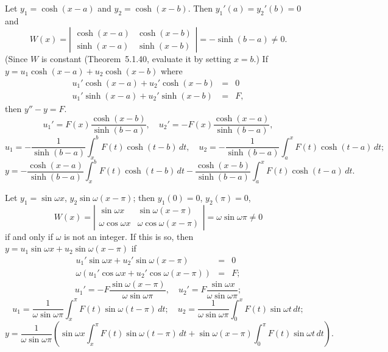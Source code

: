 \documentclass[dvips]{book}
\renewcommand{\exer}[1]{\par\medskip\;\noindent{\color{red}\bf #1.}}
\numberwithin{example}{section}
\numberwithin{equation}{section}
\numberwithin{theorem}{section}
\numberwithin{table}{section}
\numberwithin{figure}{section}
\begin{document}
\exer{13.1.14}
Let $y_{1}=\cosh(x-a)$  and $y_{2}=\cosh(x-b)$. Then
$y_{1}'(a)=y_{2}'(b)=0$  and
$$
W(x)=
\left|\begin{array}{rr}
\cosh(x-a)&\cosh(x-b)\\\sinh(x-a)&\sinh(x-b)
\end{array}\right|=-\sinh(b-a)\ne0.
$$
(Since $W$ is constant  (Theorem~5.1.40, evaluate it by
setting $x=b$.)
If \\$y=u_{1}\cosh(x-a)+u_{2}\cosh(x-b)$ where
\begin{eqnarray*}
u_{1}'\cosh(x-a)+u_{2}'\cosh(x-b)&=&0 \\
u_{1}'\sinh(x-a)+u_{2}'\sinh(x-b)&=&F,
\end{eqnarray*}
then $y''-y=F$.
$$
u_{1}'=F(x)\frac{\cosh(x-b)}{\sinh(b-a)}, \quad
u_{2}'=-F(x)\frac{\cosh(x-a)}{\sinh(b-a)},
$$
$$
u_{1}=-\frac{1}{\sinh(b-a)}\int_{x}^{b}F(t)\cosh(t-b)\,dt,\quad
u_{2}=-\frac{1}{\sinh(b-a)}\int_{a}^{x}F(t)\cosh(t-a)\,dt;
$$
$$
y=-\frac{\cosh(x-a)}{\sinh(b-a)}\int_{x}^{b}F(t)\cosh(t-b)\,dt
-\frac{\cosh(x-b)}{\sinh(b-a)}\int_{a}^{x}F(t)\cosh(t-a)\,dt.
$$


\exer{13.1.16} Let $y_{1}=\sin\omega x$, $y_{2}\sin\omega(x-\pi)$; then
$y_{1}(0)=0$, $y_{2}(\pi)=0$,
$$
W(x)=
\left|\begin{array}{ccccccc}
\sin\omega x&\sin\omega(x-\pi)\\
\omega\cos\omega x &\omega\cos\omega(x-\pi)
\end{array}\right|=\omega\sin\omega\pi\ne0
$$
if  and only if $\omega$ is not an integer. If this is so, then
$y=u_{1}\sin\omega x+u_{2}\sin\omega(x-\pi)$ if
\begin{eqnarray*}
u_{1}'\sin\omega x+u_{2}'\sin\omega(x-\pi)&=&0\\
\omega(u_{1}'\cos\omega x+u_{2}'\cos\omega(x-\pi))&=&F;
\end{eqnarray*}
$$
u_{1}'=-F\frac{\sin\omega(x-\pi)}{\omega\sin\omega\pi}, \quad
u_{2}'=F\frac{\sin\omega x}{\omega\sin\omega\pi};
$$
$$
u_{1}=\frac{1}{\omega\sin \omega \pi}\int_{x}^{\pi}
F(t)\sin\omega(t-\pi)\,dt;\quad
u_{2}=\frac{1}{\omega\sin \omega \pi}\int_{0}^{x}
F(t)\sin\omega t\,dt;
$$
$$
y=\frac{1}{\omega\sin \omega \pi}\left(
\sin\omega x\int_{x}^{\pi}F(t)\sin\omega(t-\pi)\,dt +
\sin\omega(x-\pi) \int_{0}^{\pi}
F(t)\sin\omega t\,dt\right).
$$
\end{document}
